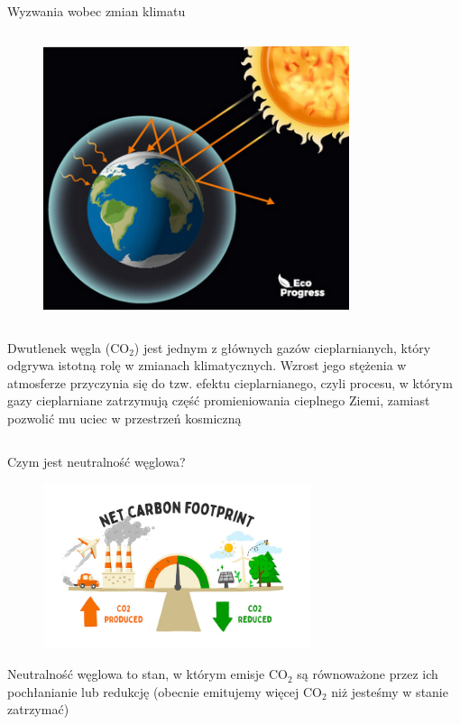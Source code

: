 \begin{columnframe}{Wyzwania wobec zmian klimatu}
    \begin{column}{0.5\textwidth}
        \begin{figure}
            \centering
            \includegraphics[width=0.8\textwidth, frame]{images/greenhouse_effect_stock_image.png}
        \end{figure}
    \end{column}
    \begin{column}{0.5\textwidth}
        Dwutlenek węgla (CO$_2$) jest jednym z głównych gazów cieplarnianych, który odgrywa istotną rolę w zmianach klimatycznych. Wzrost jego stężenia w atmosferze przyczynia się do tzw. efektu cieplarnianego, czyli procesu, w którym gazy cieplarniane zatrzymują część promieniowania cieplnego Ziemi, zamiast pozwolić mu uciec w przestrzeń kosmiczną
    \end{column}
\end{columnframe}

\begin{frame}{Czym jest neutralność węglowa?}
    \begin{figure}
        \includegraphics[width=0.7\textwidth]{images/carbon_footprint_infographic.png}
    \end{figure}



    Neutralność węglowa to stan, w którym emisje CO$_2$ są równoważone przez ich pochłanianie lub redukcję (obecnie emitujemy więcej CO$_2$ niż jesteśmy w stanie zatrzymać)
\end{frame}

